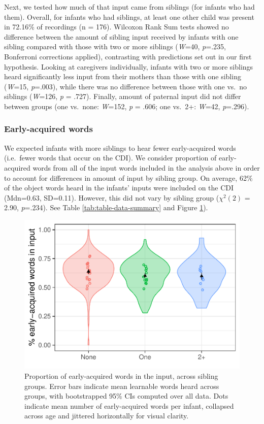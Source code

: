 \documentclass[
  english,
  man,floatsintext]{apa6}
\begin{document}
Next, we tested how much of that input came from siblings (for infants who had them). Overall, for infants who had siblings, at least one other child was present in 72.16\% of recordings (n = 176). Wilcoxon Rank Sum tests showed no difference between the amount of sibling input received by infants with one sibling compared with those with two or more siblings (\emph{W}=40, \emph{p}=.235, Bonferroni corrections applied), contrasting with predictions set out in our first hypothesis. Looking at caregivers individually, infants with two or more siblings heard significantly less input from their mothers than those with one sibling (\emph{W}=15, \emph{p}=.003), while there was no difference between those with one vs.~no siblings (\emph{W}=126, \emph{p} = .727). Finally, amount of paternal input did not differ between groups (one vs.~none: \emph{W}=152, \emph{p} = .606; one vs.~2+: \emph{W}=42, \emph{p}=.296).

\hypertarget{early-acquired-words}{%
\subsubsection{Early-acquired words}\label{early-acquired-words}}

We expected infants with more siblings to hear fewer early-acquired words (i.e.~fewer words that occur on the CDI). We consider proportion of early-acquired words from all of the input words included in the analysis above in order to account for differences in amount of input by sibling group. On average, 62\% of the object words heard in the infants' inputs were included on the CDI (Mdn=0.63, SD=0.11). However, this did not vary by sibling group (\(\chi^2 (2)\) = 2.90, \emph{p}=.234). See Table \ref{tab:table-data-summary} and Figure \ref{fig:Figure-in-cdi}).

\begin{figure}
\centering
\includegraphics{SiblingsStudyText_files/figure-latex/Figure-in-cdi-1.pdf}
\caption{\label{fig:Figure-in-cdi}Proportion of early-acquired words in the input, across sibling groups. Error bars indicate mean learnable words heard across groups, with bootstrapped 95\% CIs computed over all data. Dots indicate mean number of early-acquired words per infant, collapsed across age and jittered horizontally for visual clarity.}
\end{figure}
\end{document}
